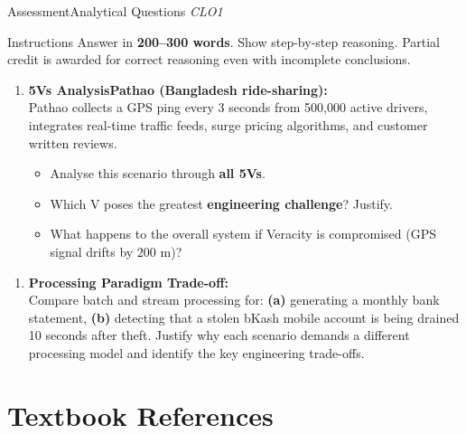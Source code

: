 \documentclass[aspectratio=169,10pt]{beamer}
\begin{document}
\begin{frame}{Assessment\textemdash Analytical Questions \hfill\small\textit{CLO1}}
  \begin{block}{Instructions}
    Answer in \textbf{200--300 words}.  Show step-by-step reasoning.  Partial credit is awarded for correct reasoning even with incomplete conclusions.
  \end{block}
  \vspace{6pt}
  \begin{enumerate}[\textbf{A1.}]
    \item \textbf{5Vs Analysis\textemdash Pathao (Bangladesh ride-sharing):}\\
    Pathao collects a GPS ping every 3 seconds from 500{,}000 active drivers, integrates real-time traffic feeds, surge pricing algorithms, and customer written reviews.
    \begin{itemize}
      \small
      \item Analyse this scenario through \textbf{all 5Vs}.
      \item Which V poses the greatest \textbf{engineering challenge}?  Justify.
      \item What happens to the overall system if Veracity is compromised (GPS signal drifts by 200 m)?
    \end{itemize}
  \end{enumerate}
  \vspace{8pt}
  \begin{enumerate}[\textbf{A2.}]
    \item \textbf{Processing Paradigm Trade-off:}\\
    Compare batch and stream processing for: \textbf{(a)} generating a monthly bank statement, \textbf{(b)} detecting that a stolen bKash mobile account is being drained 10 seconds after theft.  Justify why each scenario demands a different processing model and identify the key engineering trade-offs.
  \end{enumerate}
\end{frame}

\section*{Textbook References}
\end{document}
